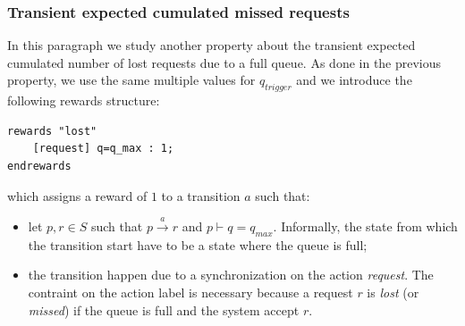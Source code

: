 \subsubsection{Transient expected cumulated missed requests }
In this paragraph we study another property about the transient
expected cumulated number of lost requests due to a full queue. As
done in the previous property, we use the same multiple values for
$q_{trigger}$ and we introduce the following rewards structure:
\begin{verbatim}
rewards "lost"
	[request] q=q_max : 1;
endrewards
\end{verbatim}
which assigns a reward of $1$ to a transition $a$ such that:
\begin{itemize}
\item let $p, r \in S$ such that $ p \xrightarrow{a} r$ and $p \vdash
  q= q_{max}$. Informally, the state from which the transition start
  have to be a state where the queue is full;
\item the transition happen due to a synchronization on the action
  \emph{request}. The contraint on the action label is necessary
  because a request $r$ is \emph{lost} (or \emph{missed}) if the queue
  is full and the system accept $r$.
\end{itemize}

